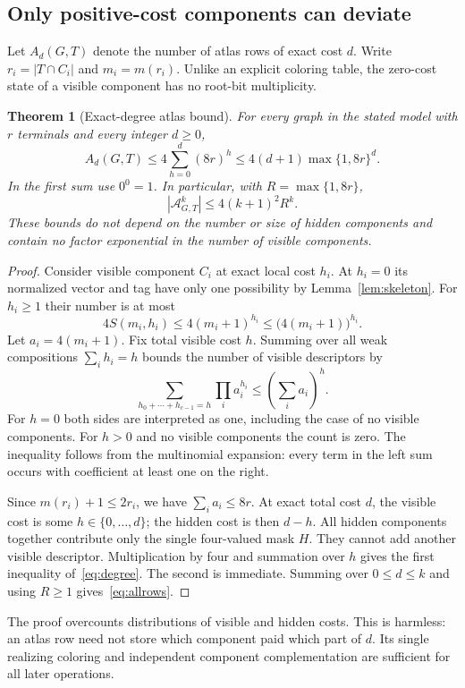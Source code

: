 \documentclass[11pt,letterpaper]{article}
\newtheorem{theorem}{Theorem}[section]
\theoremstyle{definition}
\theoremstyle{remark}\newtheorem{remark}[theorem]{Remark}
\newcommand{\Atlas}{\mathcal A}
\begin{document}
\subsection{Only positive-cost components can deviate}
Let $A_d(G,T)$ denote the number of atlas rows of exact cost $d$. Write $r_i=|T\cap C_i|$ and $m_i=m(r_i)$. Unlike an explicit coloring table, the zero-cost state of a visible component has no root-bit multiplicity.

\begin{theorem}[Exact-degree atlas bound]\label{thm:rows}
For every graph in the stated model with $r$ terminals and every integer $d\ge0$,
\begin{equation}\label{eq:degree}
 A_d(G,T)\le4\sum_{h=0}^{d}(8r)^h
 \le4(d+1)\max\{1,8r\}^{d}.
\end{equation}
In the first sum use $0^0=1$. In particular, with $R=\max\{1,8r\}$,
\begin{equation}\label{eq:allrows}
 |\Atlas^k_{G,T}|\le4(k+1)^2R^k.
\end{equation}
These bounds do not depend on the number or size of hidden components and contain no factor exponential in the number of visible components.
\end{theorem}
\begin{proof}
Consider visible component $C_i$ at exact local cost $h_i$. At $h_i=0$ its normalized vector and tag have only one possibility by Lemma~\ref{lem:skeleton}. For $h_i\ge1$ their number is at most
\[
 4S(m_i,h_i)\le4(m_i+1)^{h_i}
 \le\bigl(4(m_i+1)\bigr)^{h_i}.
\]
Let $a_i=4(m_i+1)$. Fix total visible cost $h$. Summing over all weak compositions $\sum_i h_i=h$ bounds the number of visible descriptors by
\[
 \sum_{h_0+\cdots+h_{c-1}=h}\prod_i a_i^{h_i}
 \le \left(\sum_i a_i\right)^h.
\]
For $h=0$ both sides are interpreted as one, including the case of no visible components. For $h>0$ and no visible components the count is zero. The inequality follows from the multinomial expansion: every term in the left sum occurs with coefficient at least one on the right.

Since $m(r_i)+1\le2r_i$, we have $\sum_i a_i\le8r$. At exact total cost $d$, the visible cost is some $h\in\{0,\ldots,d\}$; the hidden cost is then $d-h$. All hidden components together contribute only the single four-valued mask $H$. They cannot add another visible descriptor. Multiplication by four and summation over $h$ gives the first inequality of~\eqref{eq:degree}. The second is immediate. Summing over $0\le d\le k$ and using $R\ge1$ gives~\eqref{eq:allrows}.
\end{proof}
The proof overcounts distributions of visible and hidden costs. This is harmless: an atlas row need not store which component paid which part of $d$. Its single realizing coloring and independent component complementation are sufficient for all later operations.
\end{document}
